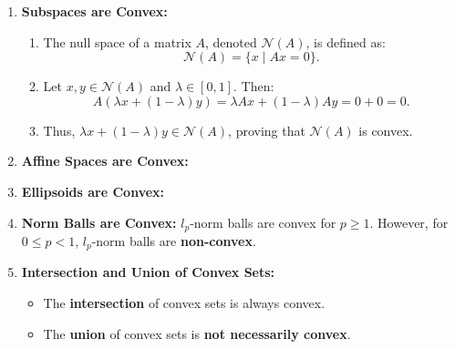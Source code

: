 \begin{example}
    \begin{enumerate}
        \item \textbf{Subspaces are Convex:} 
        \begin{enumerate}
            \item The null space of a matrix $A$, denoted $\mathcal{N}(A)$, is defined as:
            \[
            \mathcal{N}(A) = \{x \mid A x = 0\}.
            \]
            \item Let $x, y \in \mathcal{N}(A)$ and $\lambda \in [0, 1]$. Then:
            \[
            A(\lambda x + (1 - \lambda)y) = \lambda A x + (1 - \lambda) A y = 0 + 0 = 0.
            \]
            \item Thus, $\lambda x + (1 - \lambda)y \in \mathcal{N}(A)$, proving that $\mathcal{N}(A)$ is convex.
        \end{enumerate}
        \item \textbf{Affine Spaces are Convex:} 
    
        \item \textbf{Ellipsoids are Convex:} 
    
        \item \textbf{Norm Balls are Convex:} $l_p$-norm balls are convex for $p \geq 1$. However, for $0 \leq p < 1$, $l_p$-norm balls are \textbf{non-convex}.
    
        \item \textbf{Intersection and Union of Convex Sets:}
        \begin{itemize}
            \item The \textbf{intersection} of convex sets is always convex.
            \item The \textbf{union} of convex sets is \textbf{not necessarily convex}.
        \end{itemize}
    \end{enumerate}    
\end{example}

